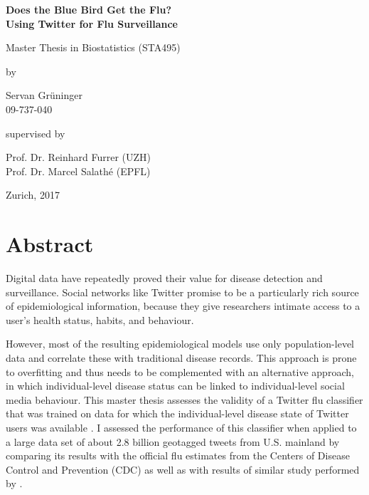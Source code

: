 \documentclass[11pt, a4paper,twoside]{report}\usepackage[]{graphicx}\usepackage[]{color}
\renewcommand\familydefault{\sfdefault}
\newcommand{\bigtitle}{Does the Blue Bird Get the Flu?}
\newcommand{\subtitle}{Using Twitter for Flu Surveillance}
\newcommand{\mytitle}[3]{}
\begin{document}
\renewcommand{\baselinestretch}{1.5}\normalfont
\begin{center}
\setlength{\parindent}{0cm}
\bf\Large%
Does the Blue Bird Get the Flu?\\
Using Twitter for Flu Surveillance
\normalfont



\hrulefill

\vspace*{4cm}

\large
Master Thesis in Biostatistics (STA495)
\vspace*{12mm}

by

\vspace*{12mm}

Servan Grüninger\\
\small 09-737-040\\
\normalfont
\vspace*{4cm}

supervised by

\vspace*{1cm}

Prof. Dr. Reinhard Furrer (UZH)\\
Prof. Dr. Marcel Salathé (EPFL)

\vfill

Zurich, 2017
\end{center}
\renewcommand\familydefault{\rmdefault}\normalfont%
\setcounter{page}{0}
\thispagestyle{empty}
\cleardoublepage


\pagestyle{standard}


\chapter*{Abstract}
Digital data have repeatedly proved their value for disease detection and surveillance. Social networks like Twitter promise to be a particularly rich source of epidemiological information, because they give researchers intimate access to a user's health status, habits, and behaviour. 

However, most of the resulting epidemiological models use only population-level data and correlate these with traditional disease records. This approach is prone to overfitting and thus needs to be complemented with an alternative approach, in which individual-level disease status can be linked to individual-level social media behaviour. This master thesis assesses the validity of a Twitter flu classifier that was trained on data for which the individual-level disease state of Twitter users was available \cite{bodnar_ground_2014}. I assessed the performance of this classifier when applied to a large data set of about 2.8 billion geotagged tweets from U.S. mainland by comparing its results with the official flu estimates from the Centers of Disease Control and Prevention (CDC) as well as with results of similar study performed by \cite{bodnar_data_2015}. 
\end{document}
